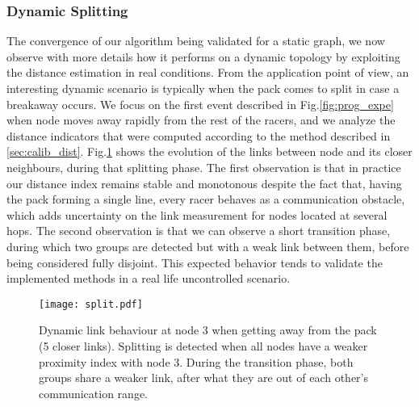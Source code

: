\documentclass{sig-alternate}
\begin{document}
\subsubsection{Dynamic Splitting}
The convergence of our algorithm being validated for a static graph, we now observe with more details how it performs on a dynamic topology by exploiting the distance estimation in real conditions. From the application point of view, an interesting dynamic scenario is typically when the pack comes to split in case a breakaway occurs.
We focus on the first event described in Fig.\ref{fig:prog_expe} when node  moves away rapidly from the rest of the racers, and we analyze the distance indicators that were computed according to the method described in \ref{sec:calib_dist}. Fig.\ref{fig:split} shows the evolution of the links between node  and its  closer neighbours, during that splitting phase.
The first observation is that in practice our distance index
remains stable and monotonous despite the fact that,  having the pack forming a single line, every racer behaves as a communication obstacle,
which adds uncertainty on the link measurement for nodes
located at several hops.
The second observation is that we can observe a short transition phase, during which two groups are detected but with a weak link between them, before being considered fully disjoint. This expected behavior tends to validate the implemented methods in a real life uncontrolled scenario.

\begin{figure}[t]
\centering
\texttt{[image: split.pdf]}
\caption{Dynamic link behaviour at node 3 when getting away from the pack (5 closer links). Splitting is detected when all nodes have a weaker proximity index with node 3. During the transition phase, both groups share a weaker link, after what they are out of each other's communication range.}
\label{fig:split}
\end{figure}
\end{document}
